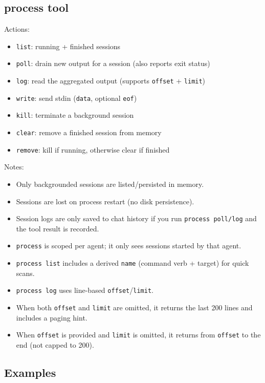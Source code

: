 \subsection{process tool}


Actions:

\begin{itemize}
  \item \texttt{list}: running + finished sessions
  \item \texttt{poll}: drain new output for a session (also reports exit status)
  \item \texttt{log}: read the aggregated output (supports \texttt{offset} + \texttt{limit})
  \item \texttt{write}: send stdin (\texttt{data}, optional \texttt{eof})
  \item \texttt{kill}: terminate a background session
  \item \texttt{clear}: remove a finished session from memory
  \item \texttt{remove}: kill if running, otherwise clear if finished
\end{itemize}


Notes:

\begin{itemize}
  \item Only backgrounded sessions are listed/persisted in memory.
  \item Sessions are lost on process restart (no disk persistence).
  \item Session logs are only saved to chat history if you run \texttt{process poll/log} and the tool result is recorded.
  \item \texttt{process} is scoped per agent; it only sees sessions started by that agent.
  \item \texttt{process list} includes a derived \texttt{name} (command verb + target) for quick scans.
  \item \texttt{process log} uses line-based \texttt{offset}/\texttt{limit}.
  \item When both \texttt{offset} and \texttt{limit} are omitted, it returns the last 200 lines and includes a paging hint.
  \item When \texttt{offset} is provided and \texttt{limit} is omitted, it returns from \texttt{offset} to the end (not capped to 200).
\end{itemize}


\subsection{Examples}


